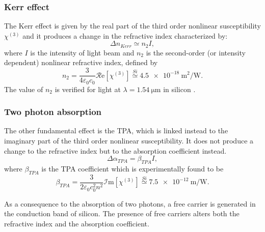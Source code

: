 \subsubsection{Kerr effect}
The Kerr effect is given by the real part of the third order nonlinear susceptibility $\chi^{(3)}$ and it produces a change in the refractive index characterized by:
\begin{equation}
	\Delta n_{Kerr} \simeq n_2 I,
\end{equation}
where $I$ is the intensity of light beam and $n_2$ is the second-order (or intensity dependent) nonlinear refractive index, defined by
\begin{equation}
	n_2 = \dfrac{3}{4\varepsilon_0 c_0} \mathcal{R}\mathrm{e} \left[ \chi^{(3)} \right]
	\overset{Si}{\simeq} \SI{4.5e-18}{\square\m\per\W}.
\end{equation}
The value of $n_2$ is verified for light at $\lambda=\SI{1.54}{\um}$ in silicon \cite{chen2012bistability}.

\subsubsection{Two photon absorption}
The other fundamental effect is the \ac{TPA}, which is linked instead to the imaginary part of the third order nonlinear susceptibility.
It does not produce a change to the refractive index but to the absorption coefficient instead.
\begin{equation}
	\Delta\alpha_{TPA} = \beta_{TPA} I,
\end{equation}
where $\beta_{TPA}$ is the TPA coefficient which is experimentally found to be \cite{chen2012bistability}
\begin{equation}
	\beta_{TPA} = \dfrac{3}{2\varepsilon_0 c_0^2n^2} \mathcal{I}\mathrm{m} \left[ \chi^{(3)} \right]
	\overset{Si}{\simeq} \SI{7.5e-12}{\m\per\W}.
\end{equation}

As a consequence to the absorption of two photons, a free carrier is generated in the conduction band of silicon.
The presence of free carriers alters both the refractive index and the absorption coefficient.

